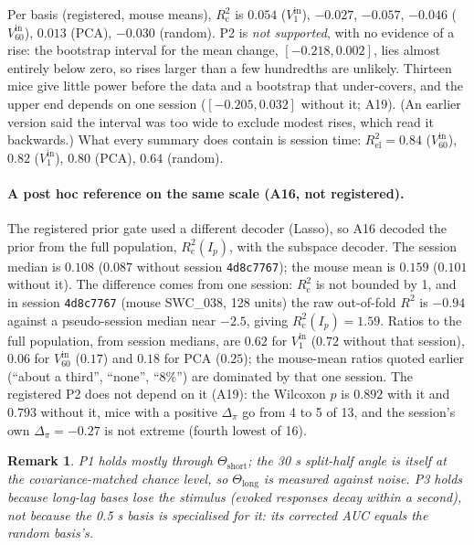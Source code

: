 \documentclass[11pt]{article}
\newcommand{\Rc}{R^2_{\mathrm{c}}}
\newtheorem*{remark}{Remark}
\begin{document}
Per basis (registered, mouse means), $\Rc$ is $0.054$ ($V^{\mathrm{in}}_1$), $-0.027$, $-0.057$, $-0.046$
($V^{\mathrm{in}}_{60}$), $0.013$ (PCA), $-0.030$ (random). P2 is \emph{not supported}, with no evidence of a rise: the
bootstrap interval for the mean change, $[-0.218, 0.002]$, lies almost entirely below zero, so rises larger than a
few hundredths are unlikely. Thirteen mice give little power before the data and a bootstrap that under-covers, and
the upper end depends on one session ($[-0.205, 0.032]$ without it; A19). (An earlier version said the interval was
too wide to exclude modest rises, which read it backwards.) What every summary does contain is session time: $R^2_{\mathrm{el}} = 0.84$ ($V^{\mathrm{in}}_{60}$),
$0.82$ ($V^{\mathrm{in}}_1$), $0.80$ (PCA), $0.64$ (random).

\paragraph{A post hoc reference on the same scale (A16, not registered).} The registered prior gate used a different
decoder (Lasso), so A16 decoded the prior from the full population, $\Rc(I_p)$, with the subspace decoder. The session
median is $0.108$ ($0.087$ without session \texttt{4d8c7767}); the mouse mean is $0.159$ ($0.101$ without it). The
difference comes from one session: $\Rc$ is not bounded by 1, and in session \texttt{4d8c7767} (mouse SWC\_038, 128
units) the raw out-of-fold $R^2$ is $-0.94$ against a pseudo-session median near $-2.5$, giving $\Rc(I_p) = 1.59$.
Ratios to the full population, from session medians, are $0.62$ for $V^{\mathrm{in}}_1$ ($0.72$ without that session),
$0.06$ for $V^{\mathrm{in}}_{60}$ ($0.17$) and $0.18$ for PCA ($0.25$); the mouse-mean ratios quoted earlier (``about a
third'', ``none'', ``8\%'') are dominated by that one session. The registered P2 does not depend on it (A19): the
Wilcoxon $p$ is $0.892$ with it and $0.793$ without it, mice with a positive $\Delta_\pi$ go from 4 to 5 of 13, and the
session's own $\Delta_\pi = -0.27$ is not extreme (fourth lowest of 16).

\begin{remark}
P1 holds mostly through $\Theta_{\mathrm{short}}$; the 30 s split-half angle is itself at the covariance-matched
chance level, so $\Theta_{\mathrm{long}}$ is measured against noise. P3 holds because long-lag bases lose the stimulus (evoked
responses decay within a second), not because the 0.5 s basis is specialised for it: its corrected AUC equals the
random basis's.
\end{remark}
\end{document}
